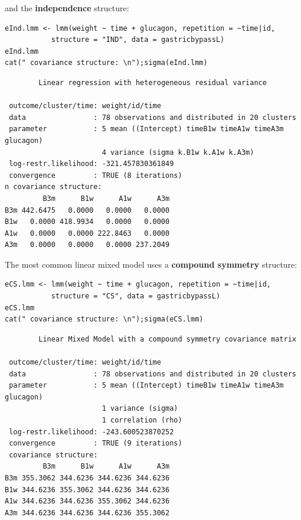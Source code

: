 \documentclass[12pt]{article}
\begin{document}
and the \textbf{independence} structure:
\lstset{language=r,label= ,caption= ,captionpos=b,numbers=none}
\begin{lstlisting}
eInd.lmm <- lmm(weight ~ time + glucagon, repetition = ~time|id, 
	       structure = "IND", data = gastricbypassL)
eInd.lmm
cat(" covariance structure: \n");sigma(eInd.lmm)
\end{lstlisting}

\begin{verbatim}
		Linear regression with heterogeneous residual variance 

 outcome/cluster/time: weight/id/time 
 data                : 78 observations and distributed in 20 clusters 
 parameter           : 5 mean ((Intercept) timeB1w timeA1w timeA3m glucagon) 
                       4 variance (sigma k.B1w k.A1w k.A3m) 
 log-restr.likelihood: -321.457830361849 
 convergence         : TRUE (8 iterations)
n covariance structure: 
         B3m      B1w      A1w      A3m
B3m 442.6475   0.0000   0.0000   0.0000
B1w   0.0000 418.9934   0.0000   0.0000
A1w   0.0000   0.0000 222.8463   0.0000
A3m   0.0000   0.0000   0.0000 237.2049
\end{verbatim}

\clearpage

The most common linear mixed model uses a \textbf{compound symmetry} structure:
\lstset{language=r,label= ,caption= ,captionpos=b,numbers=none}
\begin{lstlisting}
eCS.lmm <- lmm(weight ~ time + glucagon, repetition = ~time|id,
	       structure = "CS", data = gastricbypassL)
eCS.lmm
cat(" covariance structure: \n");sigma(eCS.lmm)
\end{lstlisting}

\begin{verbatim}
		Linear Mixed Model with a compound symmetry covariance matrix 

 outcome/cluster/time: weight/id/time 
 data                : 78 observations and distributed in 20 clusters 
 parameter           : 5 mean ((Intercept) timeB1w timeA1w timeA3m glucagon) 
                       1 variance (sigma) 
                       1 correlation (rho) 
 log-restr.likelihood: -243.600523870252 
 convergence         : TRUE (9 iterations)
 covariance structure: 
         B3m      B1w      A1w      A3m
B3m 355.3062 344.6236 344.6236 344.6236
B1w 344.6236 355.3062 344.6236 344.6236
A1w 344.6236 344.6236 355.3062 344.6236
A3m 344.6236 344.6236 344.6236 355.3062
\end{verbatim}
\end{document}

